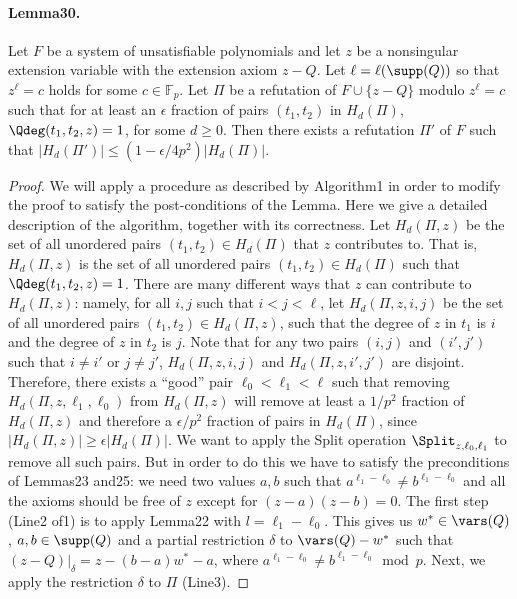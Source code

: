 \paragraph{Lemma30.} Let $F$ be a system of unsatisfiable polynomials and let $z$ be a nonsingular extension variable with the extension axiom $z-Q$. Let $\ell=\ell(\supp(Q))$ so that $z^{\ell}=c$ holds for some $c\in\mathbb F_p$. Let $\Pi$ be a refutation of $F\cup\{z-Q\}$ modulo $z^{\ell}=c$ such that for at least an $\epsilon$ fraction of pairs $(t_1,t_2)$ in $H_d(\Pi)$, $\Qdeg(t_1,t_2,z)=1$, for some $d\geq0$. Then there exists a refutation $\Pi'$ of $F$ such that $|H_d(\Pi')|\leq(1-\epsilon/4p^2)|H_d(\Pi)|$.
\begin{proof}
We will apply a procedure as described by Algorithm1 in order to modify the proof to satisfy the post-conditions of the Lemma. Here we give a detailed description of the algorithm, together with its correctness. Let $H_d(\Pi,z)$ be the set of all unordered pairs $(t_1,t_2)\in H_d(\Pi)$ that $z$ contributes to. That is, $H_d(\Pi,z)$ is the set of all unordered pairs $(t_1,t_2)\in H_d(\Pi)$ such that $\Qdeg(t_1,t_2,z)=1$. There are many different ways that $z$ can contribute to $H_d(\Pi,z)$: namely, for all $i,j$ such that $i<j<\ell$, let $H_d(\Pi,z,i,j)$ be the set of all unordered pairs $(t_1,t_2)\in H_d(\Pi,z)$, such that the degree of $z$ in $t_1$ is $i$ and the degree of $z$ in $t_2$ is $j$. Note that for any two pairs $(i,j)$ and $(i',j')$ such that $i\neq i'$ or $j\neq j'$, $H_d(\Pi,z,i,j)$ and $H_d(\Pi,z,i',j')$ are disjoint. Therefore, there exists a ``good'' pair $\ell_0<\ell_1<\ell$ such that removing $H_d(\Pi,z,\ell_1,\ell_0)$ from $H_d(\Pi,z)$ will remove at least a $1/p^2$ fraction of $H_d(\Pi,z)$ and therefore a $\epsilon/p^2$ fraction of pairs in $H_d(\Pi)$, since $|H_d(\Pi,z)|\geq\epsilon|H_d(\Pi)|$.
We want to apply the Split operation $\Split_{z,\ell_0,\ell_1}$ to remove all such pairs. But in order to do this we have to satisfy the preconditions of Lemmas23 and25: we need two values $a,b$ such that $a^{\ell_1-\ell_0}\neq b^{\ell_1-\ell_0}$ and all the axioms should be free of $z$ except for $(z-a)(z-b)=0$. The first step (Line2 of1) is to apply Lemma22 with $l=\ell_1-\ell_0$. This gives us $w^*\in\vars(Q)$, $a,b\in\supp(Q)$ and a partial restriction $\delta$ to $\vars(Q)-w^*$ such that $(z-Q)|_{\delta}=z-(b-a)w^*-a$, where $a^{\ell_1-\ell_0}\neq b^{\ell_1-\ell_0}\bmod p$. Next, we apply the restriction $\delta$ to $\Pi$ (Line3).

\end{proof}
